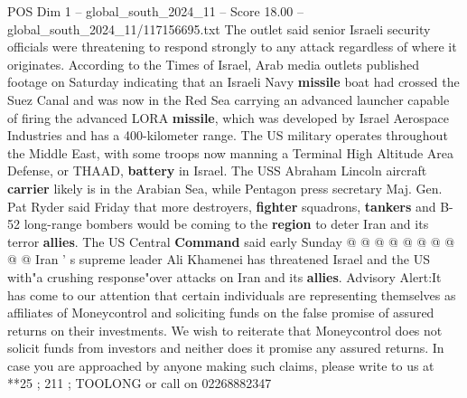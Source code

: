 \begin{textsample}{POS Dim 1 – global\_south\_2024\_11 – Score 18.00 – global\_south\_2024\_11/117156695.txt}
The outlet said senior Israeli security officials were threatening to respond strongly to any attack regardless of where it originates.
According to the Times of Israel, Arab media outlets published footage on Saturday indicating that an Israeli Navy \textbf{missile} boat had crossed the Suez Canal and was now in the Red Sea carrying an advanced launcher capable of firing the advanced LORA \textbf{missile}, which was developed by Israel Aerospace Industries and has a 400-kilometer range.
The US military operates throughout the Middle East, with some troops now manning a Terminal High Altitude Area Defense, or THAAD, \textbf{battery} in Israel.
The USS Abraham Lincoln aircraft \textbf{carrier} likely is in the Arabian Sea, while Pentagon press secretary Maj.
Gen.
Pat Ryder said Friday that more destroyers, \textbf{fighter} squadrons, \textbf{tankers} and B-52 long-range bombers would be coming to the \textbf{region} to deter Iran and its terror \textbf{allies}.
The US Central \textbf{Command} said early Sunday @ @ @ @ @ @ @ @ @ @ Iran ' s supreme leader Ali Khamenei has threatened Israel and the US with"a crushing response"over attacks on Iran and its \textbf{allies}.
Advisory Alert:It has come to our attention that certain individuals are representing themselves as affiliates of Moneycontrol and soliciting funds on the false promise of assured returns on their investments.
We wish to reiterate that Moneycontrol does not solicit funds from investors and neither does it promise any assured returns.
In case you are approached by anyone making such claims, please write to us at **25 ; 211 ; TOOLONG or call on 02268882347

\end{textsample}
